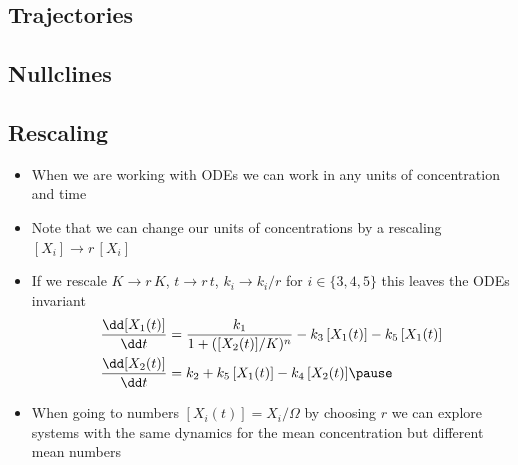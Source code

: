 \begin{slide}
\section[-2]{Trajectories}

\pause
\pb {}
\begin{center}
  \pause
\end{center}
\end{slide}


\begin{slide}
\section[-2]{Nullclines}

\pause
\pb {}
\begin{center}
  \pause
\end{center}
\end{slide}


\begin{slide}
\section[-2]{Rescaling}

\begin{PauseHighLight}
  \begin{itemize}
  \item When we are working with ODEs we can work in any units of
    concentration and time\pause
  \item Note that we can change our units of concentrations by a
    rescaling $[X_i] \rightarrow r\,[X_i]$\pause
  \item If we rescale $K\rightarrow r\,K$, $t\rightarrow r\,t$,
    $k_i\rightarrow k_i/r$ for $i\in\{3,4,5\}$ this leaves the ODEs
    invariant
    {\small \begin{align*}
      \frac{\dd [X_1(t)]}{\dd t} &= \frac{k_1}{1+([X_2(t)]/K)^n} - k_3 \,
                                 [X_1(t)]- k_5\,[X_1(t)] \\
       \frac{\dd [X_2(t)]}{\dd t} &= k_2 + k_5\,[X_1(t)] - k_4\,[X_2(t)]\pause
    \end{align*}}
\item When going to numbers $[X_i(t)]=X_i/\Omega$ by choosing $r$ we
  can explore systems with the same dynamics for the mean
  concentration but different mean numbers\pause
  \end{itemize}
\end{PauseHighLight}

\end{slide}


